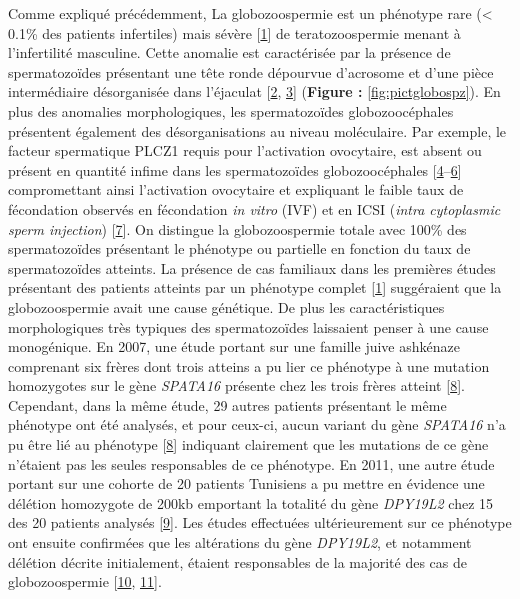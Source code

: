 \documentclass[12pt,twoside]{ugathesis}
\begin{document}
Comme expliqué précédemment, La globozoospermie est un phénotype rare
(\textless{} 0.1\% des patients infertiles) mais sévère
{[}\protect\hyperlink{ref-Sen2009}{1}{]} de teratozoospermie menant à
l'infertilité masculine. Cette anomalie est caractérisée par la présence
de spermatozoïdes présentant une tête ronde dépourvue d'acrosome et
d'une pièce intermédiaire désorganisée dans l'éjaculat
{[}\protect\hyperlink{ref-Singh}{2},
\protect\hyperlink{ref-Pedersen1974}{3}{]} (\textbf{Figure :
}\ref{fig:pictglobospz}). En plus des anomalies morphologiques, les
spermatozoïdes globozoocéphales présentent également des
désorganisations au niveau moléculaire. Par exemple, le facteur
spermatique PLCZ1 requis pour l'activation ovocytaire, est absent ou
présent en quantité infime dans les spermatozoïdes globozoocéphales
{[}\protect\hyperlink{ref-Heytens2009}{4}--\protect\hyperlink{ref-Yoon2008}{6}{]}
compromettant ainsi l'activation ovocytaire et expliquant le faible taux
de fécondation observés en fécondation \emph{in vitro} (IVF) et en ICSI
(\emph{intra cytoplasmic sperm injection})
{[}\protect\hyperlink{ref-Dam2006}{7}{]}. On distingue la
globozoospermie totale avec 100\% des spermatozoïdes présentant le
phénotype ou partielle en fonction du taux de spermatozoïdes atteints.
La présence de cas familiaux dans les premières études présentant des
patients atteints par un phénotype complet
{[}\protect\hyperlink{ref-Sen2009}{1}{]} suggéraient que la
globozoospermie avait une cause génétique. De plus les caractéristiques
morphologiques très typiques des spermatozoïdes laissaient penser à une
cause monogénique. En 2007, une étude portant sur une famille juive
ashkénaze comprenant six frères dont trois atteins a pu lier ce
phénotype à une mutation homozygotes sur le gène \emph{SPATA16} présente
chez les trois frères atteint {[}\protect\hyperlink{ref-Dam2007}{8}{]}.
Cependant, dans la même étude, 29 autres patients présentant le même
phénotype ont été analysés, et pour ceux-ci, aucun variant du gène
\emph{SPATA16} n'a pu être lié au phénotype
{[}\protect\hyperlink{ref-Dam2007}{8}{]} indiquant clairement que les
mutations de ce gène n'étaient pas les seules responsables de ce
phénotype. En 2011, une autre étude portant sur une cohorte de 20
patients Tunisiens a pu mettre en évidence une délétion homozygote de
200kb emportant la totalité du gène \emph{DPY19L2} chez 15 des 20
patients analysés {[}\protect\hyperlink{ref-Harbuz2011}{9}{]}. Les
études effectuées ultérieurement sur ce phénotype ont ensuite confirmées
que les altérations du gène \emph{DPY19L2}, et notamment délétion
décrite initialement, étaient responsables de la majorité des cas de
globozoospermie {[}\protect\hyperlink{ref-Ray2011}{10},
\protect\hyperlink{ref-ElInati2012}{11}{]}.
\end{document}
